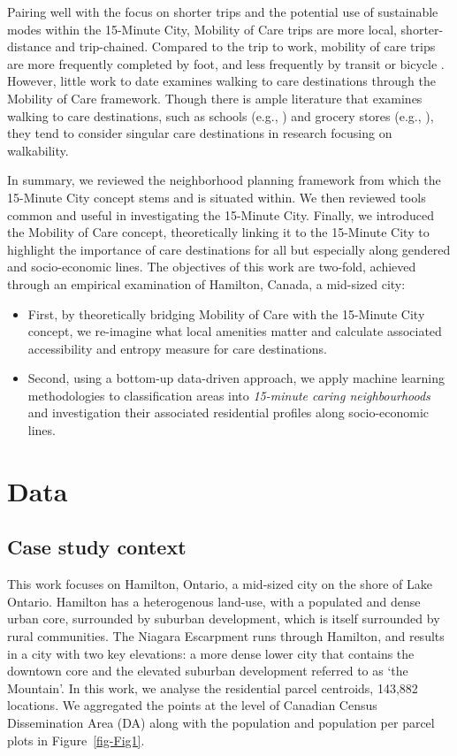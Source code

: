 \documentclass[
  authoryear,
  preprint,
  3p]{elsarticle}
\providecommand{\tightlist}{%
  \setlength{\itemsep}{0pt}\setlength{\parskip}{0pt}}\usepackage{longtable,booktabs,array}
\def\tightlist{}
\begin{document}
Pairing well with the focus on shorter trips and the potential use of
sustainable modes within the 15-Minute City, Mobility of Care trips are
more local, shorter-distance and trip-chained. Compared to the trip to
work, mobility of care trips are more frequently completed by foot, and
less frequently by transit or bicycle
\citep{ravensbergen2023exploratory}. However, little work to date
examines walking to care destinations through the Mobility of Care
framework. Though there is ample literature that examines walking to
care destinations, such as schools (e.g., \citep{RN7, RN8, RN9}) and
grocery stores (e.g., \citep{RN10, RN11}), they tend to consider
singular care destinations in research focusing on walkability.

In summary, we reviewed the neighborhood planning framework from which
the 15-Minute City concept stems and is situated within. We then
reviewed tools common and useful in investigating the 15-Minute City.
Finally, we introduced the Mobility of Care concept, theoretically
linking it to the 15-Minute City to highlight the importance of care
destinations for all but especially along gendered and socio-economic
lines. The objectives of this work are two-fold, achieved through an
empirical examination of Hamilton, Canada, a mid-sized city:

\begin{itemize}
\tightlist
\item
  First, by theoretically bridging Mobility of Care with the 15-Minute
  City concept, we re-imagine what local amenities matter and calculate
  associated accessibility and entropy measure for care destinations.
\item
  Second, using a bottom-up data-driven approach, we apply machine
  learning methodologies to classification areas into \emph{15-minute
  caring neighbourhoods} and investigation their associated residential
  profiles along socio-economic lines.
\end{itemize}

\section{Data}\label{data}

\subsection{Case study context}\label{case-study-context}

This work focuses on Hamilton, Ontario, a mid-sized city on the shore of
Lake Ontario. Hamilton has a heterogenous land-use, with a populated and
dense urban core, surrounded by suburban development, which is itself
surrounded by rural communities. The Niagara Escarpment runs through
Hamilton, and results in a city with two key elevations: a more dense
lower city that contains the downtown core and the elevated suburban
development referred to as `the Mountain'. In this work, we analyse the
residential parcel centroids, 143,882 locations. We aggregated the
points at the level of Canadian Census Dissemination Area (DA) along
with the population and population per parcel plots in
Figure~\ref{fig-Fig1}.
\end{document}
